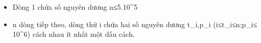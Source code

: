 \begin{itemize}
	\item     Dòng 1 chứa số nguyên dương n≤5.10^5   
	\item     n dòng tiếp theo, dòng thứ i chứa hai số nguyên dương t\_i,p\_i (i≤t\_i≤n;p\_i≤ 10^6) cách nhau ít nhất một dấu cách.   
\end{itemize}